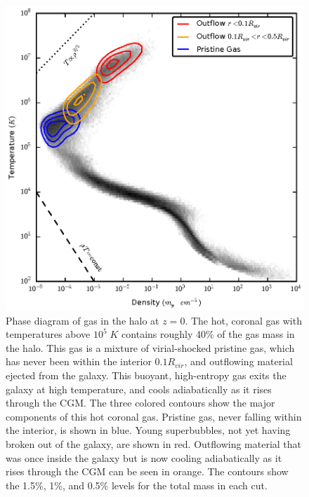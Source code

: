 \begin{figure}
    \includegraphics[width=\columnwidth]{figures2/phase.eps}
    \caption[Gas phase diagram for g1536]{Phase diagram of gas in the halo at $z=0$.  The hot, coronal gas
        with temperatures above $10^5\;K$ contains roughly 40\% of the gas mass
        in the halo.  This gas is a mixture of virial-shocked pristine gas,
        which has never been within the interior $0.1R_{vir}$, and outflowing
        material ejected from the galaxy.  This buoyant, high-entropy gas exits
        the galaxy at high temperature, and cools adiabatically as it rises
        through the CGM.  The three colored contours show the major components
        of this hot coronal gas.  Pristine gas, never falling within the
        interior, is shown in blue.  Young superbubbles, not yet having broken out
        of the galaxy, are shown in red.  Outflowing material that was once inside the
        galaxy but is now cooling adiabatically as it rises through the CGM can be seen
        in orange.  The contours show the 1.5\%, 1\%, and 0.5\% levels for the
        total mass in each cut.}
        \label{phase}
\end{figure}

